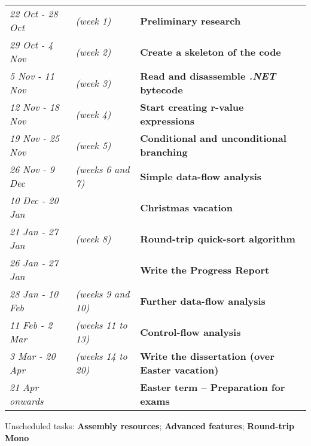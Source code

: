 \documentclass[12pt]{article}
\begin{document}
\vspace{0.1in}
\newcommand{\milestone}[3]{\emph{#1} & \emph{#2} & \textbf{#3} \\}
\begin{tabular}{l l l}
	\milestone{22 Oct - 28 Oct}{(week  1)}{Preliminary research}
	\milestone{29 Oct -  4 Nov}{(week  2)}{Create a skeleton of the code}
	\milestone{5 Nov  - 11 Nov}{(week  3)}{Read and disassemble \emph{.NET} bytecode}
	\milestone{12 Nov - 18 Nov}{(week  4)}{Start creating r-value expressions}
	\milestone{19 Nov - 25 Nov}{(week  5)}{Conditional and unconditional branching}
	\milestone{26 Nov -  9 Dec}{(weeks 6 and 7)}{Simple data-flow analysis}
	\milestone{10 Dec - 20 Jan}{}{\textnormal{Christmas vacation}}
	\milestone{21 Jan - 27 Jan}{(week  8)}{Round-trip quick-sort algorithm}
	\milestone{26 Jan - 27 Jan}{}{Write the Progress Report}
	\milestone{28 Jan - 10 Feb}{(weeks 9 and 10)}{Further data-flow analysis}
	\milestone{11 Feb -  2 Mar}{(weeks 11 to 13)}{Control-flow analysis}
	\milestone{3 Mar  - 20 Apr}{(weeks 14 to 20)}{Write the dissertation \textnormal{(over Easter vacation)}}
	\milestone{21 Apr onwards }{}{\textnormal{Easter term -- Preparation for exams}}
\end{tabular}
\vspace{0.1in}

Unscheduled tasks: \textbf{Assembly resources}; \textbf{Advanced features};
 \textbf{Round-trip Mono}
\end{document}
